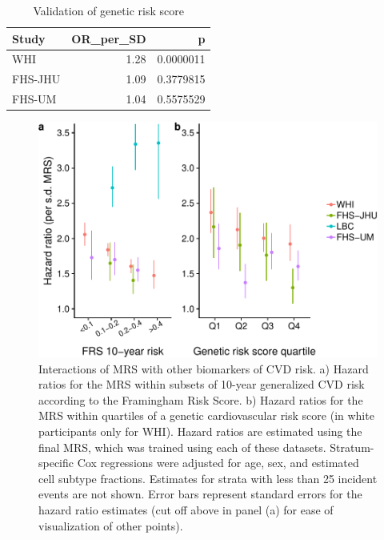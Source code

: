\documentclass[]{article}
\begin{document}
\begin{table}[t]

\caption{\label{tab:risk-score-validation}Validation of genetic risk score}
\centering
\begin{tabular}{lrr}
\toprule
Study & OR\_per\_SD & p\\
\midrule
WHI & 1.28 & 0.0000011\\
FHS-JHU & 1.09 & 0.3779815\\
FHS-UM & 1.04 & 0.5575529\\
\bottomrule
\end{tabular}
\end{table}

\begin{figure}
\centering
\includegraphics{../doc/mrs_models/figures/interactions-1.pdf}
\caption{\label{fig:interactions}Interactions of MRS with other biomarkers of CVD risk. a) Hazard ratios for the MRS within subsets of 10-year generalized CVD risk according to the Framingham Risk Score. b) Hazard ratios for the MRS within quartiles of a genetic cardiovascular risk score (in white participants only for WHI). Hazard ratios are estimated using the final MRS, which was trained using each of these datasets. Stratum-specific Cox regressions were adjusted for age, sex, and estimated cell subtype fractions. Estimates for strata with less than 25 incident events are not shown. Error bars represent standard errors for the hazard ratio estimates (cut off above in panel (a) for ease of visualization of other points).}
\end{figure}
\end{document}
